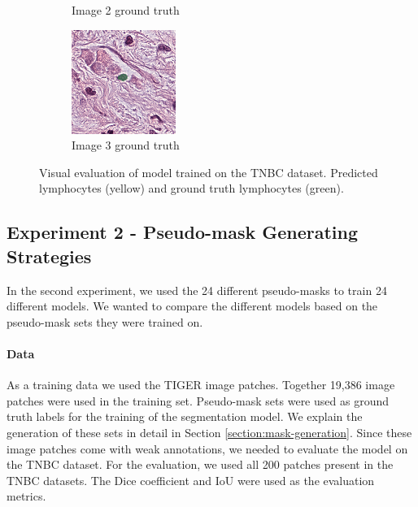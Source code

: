 \begin{figure}[H]
\begin{subfigure}[b]{0.32\textwidth}
    \caption{Image 2 ground truth}
  \end{subfigure}\hfill
  \begin{subfigure}[b]{0.32\textwidth}
    \centering
    \includegraphics[width=\linewidth]{assets/images/for_presentation/exp1-3-gt.png}
    \caption{Image 3 ground truth}
  \end{subfigure}
  \caption{Visual evaluation of model trained on the TNBC dataset. Predicted lymphocytes (yellow) and ground truth lymphocytes (green).}
  \label{fig:exp1-results}
\end{figure}

\subsection{Experiment 2 - Pseudo-mask Generating Strategies}
\label{sub:exp-2}
In the second experiment, we used the 24 different pseudo-masks to train 24 different models. We wanted to compare the different models based on the pseudo-mask sets they were trained on.

\paragraph{Data}
As a training data we used the TIGER image patches. Together 19,386 image patches were used in the training set. Pseudo-mask sets were used as ground truth labels for the training of the segmentation model. We explain the generation of these sets in detail in Section \ref{section:mask-generation}. Since these image patches come with weak annotations, we needed to evaluate the model on the TNBC dataset. For the evaluation, we used all 200 patches present in the TNBC datasets. The Dice coefficient and IoU were used as the evaluation metrics.


